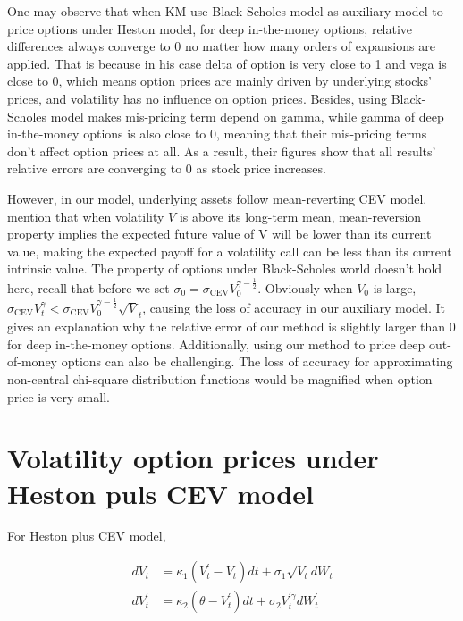 One may observe that when KM use Black-Scholes model as auxiliary model to price options under Heston model, for deep in-the-money options, relative differences always converge to 0 no matter how many orders of expansions are applied. That is because in his case delta of option is very close to 1 and vega is close to 0, which means option prices are mainly driven by underlying stocks' prices, and volatility has no influence on option prices. Besides, using Black-Scholes model makes mis-pricing term depend on gamma, while gamma of deep in-the-money options is also close to 0, meaning that their mis-pricing terms don't affect option prices at all. As a result, their figures show that all results' relative errors are converging to 0 as stock price increases.

However, in our model, underlying assets follow mean-reverting CEV model. \cite{grunbichler_valuing_1996} mention that when volatility $V$ is above its long-term mean, mean-reversion property implies the expected future value of V will be lower than its current value, making the expected payoff for a volatility call can be less than its current intrinsic value. The property of options under Black-Scholes world doesn't hold here, recall that before we set $\sigma_0 = \sigma_{\text{CEV}}V_0^{\gamma-\frac{1}{2}}$. Obviously when $V_0$ is large, $\sigma_{\text{CEV}} V^{\gamma}_t < \sigma_{\text{CEV}}V_0^{\gamma-\frac{1}{2}} \sqrt{V}_t$, causing the loss of accuracy in our auxiliary model. It gives an explanation why the relative error of our method is slightly larger than 0 for deep in-the-money options. Additionally, using our method to price deep out-of-money options can also be challenging. The loss of accuracy for approximating non-central chi-square distribution functions would be magnified when option price is very small.


\section{Volatility option prices under Heston puls CEV model}

For Heston plus CEV model,

$$
\begin{aligned}
  d V_t &=\kappa_1 \left(V^{\prime}_t - V_t\right) d t+\sigma_{1} \sqrt{V_t} d W_t \\
  d V^{\prime}_t &=\kappa_2\left(\theta -V^{\prime}_t\right) d t+\sigma_{2} V^{\prime \gamma}_t d W^{\prime}_t
\end{aligned}
$$

